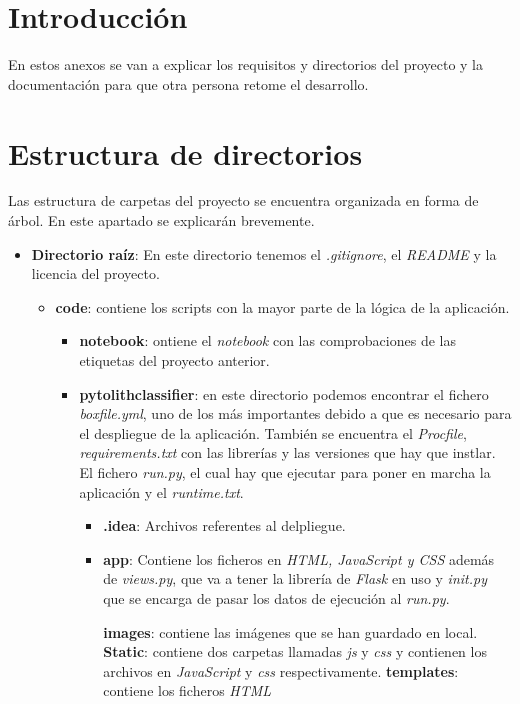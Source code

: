 
\section{Introducción}
En estos anexos se van a explicar los requisitos y directorios del proyecto y la documentación para que otra persona retome el desarrollo.
\section{Estructura de directorios}
Las estructura de carpetas del proyecto se encuentra organizada en forma de árbol. En este apartado se explicarán brevemente.

\begin{itemize}
	\item \textbf{Directorio raíz}: En este directorio tenemos el \textit{.gitignore}, el \textit{README} y la licencia del proyecto.
	\begin{itemize}
		\item \textbf{code}: contiene los scripts con la mayor parte de la lógica de la aplicación.
			\begin{itemize}
				\item \textbf{notebook}: ontiene el \textit{notebook} con las comprobaciones de las etiquetas del proyecto anterior.
				\item \textbf{pytolithclassifier}: en este directorio podemos encontrar el fichero \textit{boxfile.yml}, uno de los más importantes debido a que es necesario para el despliegue de la aplicación. También se encuentra el \textit{Procfile}, \textit{requirements.txt} con las librerías y las versiones que hay que instlar. El fichero \textit{run.py}, el cual hay que ejecutar para poner en marcha la aplicación y el \textit{runtime.txt}.
				\begin{itemize}
					\item \textbf{.idea}: Archivos referentes al delpliegue.
					\item \textbf{app}: Contiene los ficheros en \textit{HTML, JavaScript y CSS} además de \textit{views.py}, que va a tener la librería de \textit{Flask} en uso y \textit{init.py} que se encarga de pasar los datos de ejecución al \textit{run.py}.
					
						\subitem \textbf{images}: contiene las imágenes que se han guardado en local.
						\subitem \textbf{Static}: contiene dos carpetas llamadas \textit{js} y \textit{ css} y contienen los archivos en \textit{JavaScript} y \textit{css} respectivamente.
						\subitem \textbf{templates}: contiene los ficheros \textit{HTML} 
					

\end{itemize}
\end{itemize}
\end{itemize}
\end{itemize}
